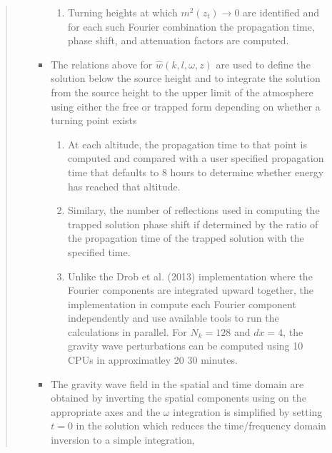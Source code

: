 \documentclass[letterpaper,10pt,english]{sphinxmanual}
\begin{document}
\begin{itemize}
\begin{quote}
\begin{itemize}
\begin{itemize}
\begin{enumerate}
\item {} 
\sphinxAtStartPar
Turning heights at which \(m^2 \left( z_t \right) \rightarrow 0\) are identified and for each such Fourier combination the propagation time, phase shift, and attenuation factors are computed.

\end{enumerate}

\item {} 
\sphinxAtStartPar
The relations above for \(\hat{w} \left( k, l, \omega, z \right)\) are used to define the solution below the source height and to integrate the solution from the source height to the upper limit of the atmosphere using either the free or trapped form depending on whether a turning point exists
\begin{enumerate}
%
\item {} 
\sphinxAtStartPar
At each altitude, the propagation time to that point is computed and compared with a user specified propagation time that defaults to 8 hours to determine whether energy has reached that altitude.

\item {} 
\sphinxAtStartPar
Similary, the number of reflections used in computing the trapped solution phase shift if determined by the ratio of the propagation time of the trapped solution with the specified time.

\item {} 
\sphinxAtStartPar
Unlike the Drob et al. (2013) implementation where the Fourier components are integrated upward together, the implementation in  compute each Fourier component independently and use available  tools to run the calculations in parallel.  For \(N_k = 128\) and \(dx=4\), the gravity wave perturbations can be computed using 10 CPUs in approximatley 20 \sphinxhyphen{} 30 minutes.

\end{enumerate}

\item {} 
\sphinxAtStartPar
The gravity wave field in the spatial and time domain are obtained by inverting the spatial components using  on the appropriate axes and the \(\omega\) integration is simplified by setting \(t=0\) in the solution which reduces the time/frequency domain inversion to a simple integration,

\end{itemize}


\end{itemize}
\end{quote}
\end{itemize}
\end{document}

